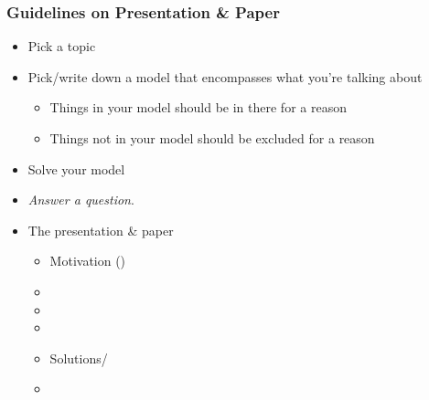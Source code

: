 \documentclass{beamer}
\begin{document}
\begin{frame}
\frametitle[alignment=center]{Guidelines on Presentation \& Paper}
\begin{itemize}
\item Pick a topic
\bigskip
\item Pick/write down a model that encompasses what you're talking about
\bigskip
\begin{itemize}
\item Things in your model should be in there for a reason
\bigskip
\item Things not in your model should be excluded for a reason
\bigskip
\end{itemize}
\item Solve your model
\bigskip
\item \emph{Answer a question}.  
\bigskip
\item The presentation \& paper  
\begin{itemize}
\item Motivation ()
\item {}
\item {}
\item {}
\item Solutions/
\item {}
\end{itemize}
\end{itemize}
\end{frame}
\end{document}
